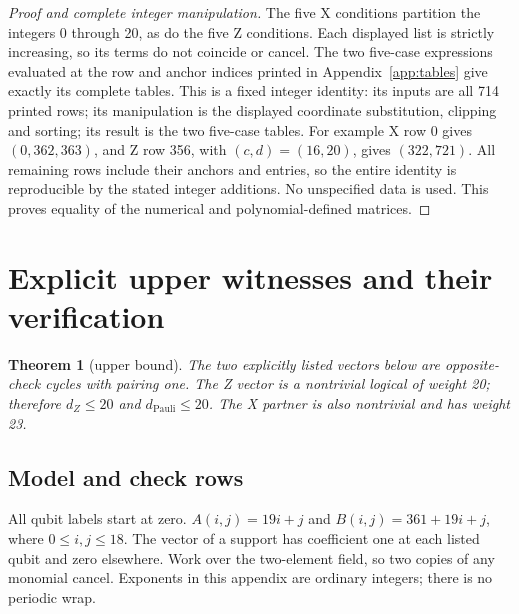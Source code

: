 \documentclass{article}
\newtheorem{theorem}{Theorem}
\begin{document}
\begin{proof}[Proof and complete integer manipulation]
  The five X conditions partition the integers 0 through 20, as do the five Z
  conditions. Each displayed list is strictly increasing, so its terms do not
  coincide or cancel. The two five-case expressions evaluated at the row and
  anchor indices printed in Appendix~\ref{app:tables} give exactly its complete tables.
  This is a fixed integer identity: its inputs are all 714 printed rows; its
  manipulation is the displayed coordinate substitution, clipping and sorting;
  its result is the two five-case tables. For example X row 0 gives
  \((0, 362, 363)\), and Z row 356, with \((c,d) = (16,20)\), gives \((322, 721)\).
  All remaining rows include their anchors and entries, so the entire identity
  is reproducible by the stated integer additions. No unspecified data is used.
  This proves equality of the numerical and polynomial-defined matrices.
\end{proof}

\section{Explicit upper witnesses and their verification}\label{app:witness}

\begin{theorem}[upper bound]\label{thm:witness}
  The two explicitly listed vectors below are
  opposite-check cycles with pairing one. The Z vector is a nontrivial logical
  of weight 20; therefore \(d_Z \le 20\) and \(d_{\mathrm{Pauli}} \le 20\). The X partner is
  also nontrivial and has weight 23.
\end{theorem}

\subsection{Model and check rows}\label{app:witness-model}

All qubit labels start at zero. \(A(i,j) = 19i + j\) and \(B(i,j) = 361 + 19i + j\),
where \(0 \le i, j \le 18\). The vector of a support has coefficient one at each
listed qubit and zero elsewhere. Work over the two-element field, so two
copies of any monomial cancel. Exponents in this appendix are ordinary
integers; there is no periodic wrap.
\end{document}
